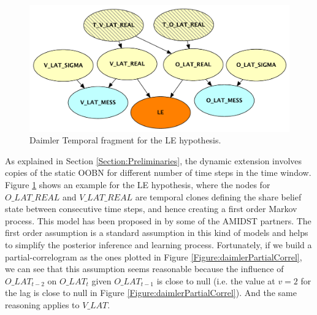 \begin{figure}
\begin{center}
\includegraphics[scale=0.58]{./figures/DaimlerLEdyn}
\end{center}
\caption{\label{Figure:daimlerLEdyn}Daimler Temporal fragment for the LE hypothesis.}
\end{figure}

As explained in Section \ref{Section:Preliminaries}, the dynamic extension involves copies of the static OOBN for different number of time steps in the time window. Figure \ref{Figure:daimlerLEdyn} shows an example for the LE hypothesis, where the nodes for $O\_LAT\_REAL$ and $V\_LAT\_REAL$ are temporal clones defining the share belief state between consecutive time steps, and hence creating a first order Markov process. This model has been proposed in \cite{Weidl2014} by some of the AMIDST partners.  The first order assumption is a standard assumption in this kind of models and helps to simplify the posterior inference and learning process. Fortunately, if we build a partial-correlogram as the ones plotted in Figure \ref{Figure:daimlerPartialCorrel}, we can see that this assumption seems reasonable because the influence of $O\_LAT_{t-2}$ on $O\_LAT_{t}$ given $O\_LAT_{t-1}$ is close to null (i.e. the value at $v=2$ for the lag is close to null in Figure \ref{Figure:daimlerPartialCorrel}). And the same reasoning applies to $V\_LAT$.

